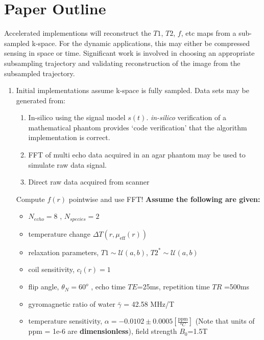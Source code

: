 \documentclass[10pt]{amsart}
\begin{document}
\section{Paper Outline}

Accelerated implementions will reconstruct the $T1$, $T2$, $f$, etc maps
from a sub-sampled k-space. For the dynamic applications, this may either be 
compressed sensing in space or time.
Significant work is involved in choosing an appropriate subsampling trajectory 
and validating reconstruction of the image from the subsampled trajectory.
\begin{enumerate}
  \item Initial implementations assume k-space is fully sampled. 
Data sets may be generated from: 
\begin{enumerate}
   \item In-silico using the signal model $s(t)$.
          \textit{in-silico} verification of a mathematical phantom provides 
             `code verification' that the algorithm implementation is correct.
   \item  FFT of multi echo data acquired in an agar phantom may be used to
simulate raw data signal. 
   \item  Direct raw data acquired from scanner
\end{enumerate}
Compute $f(r)$ pointwise and use FFT!
\textbf{Assume the following are given:} 
\begin{itemize}
\item $N_{echo} = 8$ , $N_{species} = 2$  
\item temperature change $\Delta T(r,\mu_\text{eff}(r))$
\item relaxation parameters, $T1 \sim \mathcal{U}(a,b)$, $T2^* \sim \mathcal{U}(a,b)$
\item coil sensitivity, $c_l(r) = 1$
\item flip angle, $\theta_N = 60^o$ ,  echo time $TE$=25ms, repetition time $TR$ =500ms
\item gyromagnetic ratio of water $\bar{\gamma}$ = 42.58 MHz/T
\item temperature sensitivity, $\alpha =-0.0102 \pm 0.0005 \left[\frac{\text{ppm}}{^oC}\right]$  
      (Note that units of ppm = 1e-6 are \textbf{dimensionless}),
       field strength $B_0$=1.5T
\end{itemize}

\end{enumerate}
\end{document}
